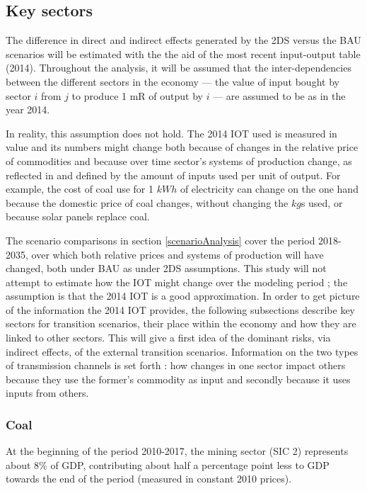 \documentclass[12pt,english]{article}
\begin{document}
\subsection{Key sectors}
The difference in direct and indirect effects generated by the 2DS versus the BAU scenarios will be estimated with the the aid of the most recent input-output table (2014). Throughout the analysis, it will be assumed that the inter-dependencies between the different sectors in the economy --- the value of input bought by sector $i$ from $j$ to produce 1 mR of output by $i$ --- are assumed to be as in the year 2014. %

In reality, this assumption does not hold. The 2014 IOT used is measured in value and its numbers might change both because of changes in the relative price of commodities and because over time sector's systems of production change, as reflected in and defined by the amount of inputs used per unit of output. For example, the cost of coal use for 1 $kWh$ of electricity can change on the one hand because the domestic price of coal changes, without changing the $kg$s used, or because solar panels replace coal.

The scenario comparisons in section \ref{scenarioAnalysis} cover the period 2018-2035, over which both relative prices and systems of production will have changed, both under BAU as under 2DS assumptions. This study will not attempt to estimate how the IOT might change over the modeling period ; the assumption is that the 2014 IOT is a good approximation. In order to get picture of the information the 2014 IOT provides, the following subsections describe key sectors for transition scenarios, their place within the economy and how they are linked to other sectors. This will give a first idea of the dominant risks, via indirect effects, of the external transition scenarios. Information on the two types of transmission channels is set forth : how changes in one sector impact others because they use the former's commodity as input and secondly because it uses inputs from others. 


\subsubsection{Coal}
At the beginning of the period 2010-2017, the mining sector (SIC 2) represents about 8\% of GDP, contributing about half a percentage point less to GDP towards the end of the period \citep{P0441StatSA2018Q2} (measured in constant 2010 prices). 
\end{document}
